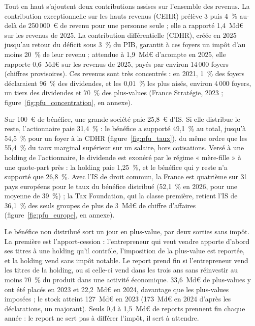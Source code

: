
Tout en haut s'ajoutent deux contributions assises sur l'ensemble des revenus. La contribution exceptionnelle sur
les hauts revenus (CEHR) prélève 3 puis 4~\% au-delà de 250\,000~€ de revenu pour une personne seule ; elle a
rapporté 1,4~Md€ sur les revenus de 2025. La contribution différentielle (CDHR), créée en 2025 jusqu'au retour du
déficit sous 3~\% du PIB, garantit à ces foyers un impôt d'au moins 20~\% de leur revenu ; attendue à 1,9~Md€
d'acompte en 2025, elle rapporte 0,6~Md€ sur les revenus de 2025, payés par environ 14\,000 foyers (chiffres
provisoires). Ces revenus sont très concentrés : en 2021, 1~\% des foyers déclaraient 96~\% des dividendes, et les
0,01~\% les plus aisés, environ 4\,000 foyers, un tiers des dividendes et 70~\% des plus-values (France Stratégie,
2023 ; figure~\ref{fig:pfu_concentration}, en annexe).

Sur 100~€ de bénéfice, une grande société paie 25,8~€ d'IS. Si elle distribue le reste, l'actionnaire paie
31,4~\% : le bénéfice a supporté 49,1~\% au total, jusqu'à 54,5~\% pour un foyer à la CDHR
(figure~\ref{fig:pfu_taux}), du même ordre que les 55,4~\% du taux marginal supérieur sur un salaire, hors
cotisations. Versé à une holding de l'actionnaire, le dividende est exonéré par le régime « mère-fille » à une
quote-part près : la holding paie 1,25~\%, et le bénéfice qui y reste n'a supporté que 26,8~\%. Avec l'IS de droit
commun, la France est quatrième sur 31 pays européens pour le taux du bénéfice distribué (52,1~\% en 2026, pour une
moyenne de 39~\%) ; la Tax Foundation, qui la classe première, retient l'IS de 36,1~\% des seuls groupes de plus de
3~Md€ de chiffre d'affaires (figure~\ref{fig:pfu_europe}, en annexe).


Le bénéfice non distribué sort un jour en plus-value, par deux sorties sans impôt. La première est
l'apport-cession : l'entrepreneur qui veut vendre apporte d'abord ses titres à une holding qu'il contrôle,
l'imposition de la plus-value est reportée, et la holding vend sans impôt notable. Le report prend fin si
l'entrepreneur vend les titres de la holding, ou si celle-ci vend dans les trois ans sans réinvestir au moins 70~\% du produit
dans une activité économique. 33,6~Md€ de plus-values y ont été placés en 2023 et 22,2~Md€ en 2024, davantage que
les plus-values imposées ; le stock atteint 127~Md€ en 2023 (173~Md€ en 2024 d'après les déclarations, un
majorant). Seuls 0,4 à 1,5~Md€ de reports prennent fin chaque année : le report ne sert pas à différer l'impôt, il
sert à attendre.

